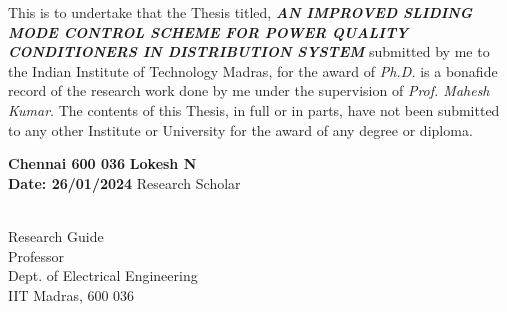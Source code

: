 \noindent This is to undertake that the Thesis titled, \textit{\textbf{AN IMPROVED SLIDING MODE CONTROL SCHEME FOR POWER QUALITY CONDITIONERS IN DISTRIBUTION SYSTEM}} submitted by me to the Indian Institute of Technology Madras, for the  award  of \textit{Ph.D.} is  a  bonafide  record  of  the  research  work  done  by  me  under  the supervision of \textit{Prof. Mahesh Kumar}. The contents of this Thesis, in full or in parts, have not been submitted to any other Institute or University for the award of any degree or diploma.
%

\vspace*{0.75in}
\textbf{Chennai 600 036} \hspace{7.5cm} \textbf{Lokesh N}\\
\vspace{-1.5cm}
\textbf{Date: 26/01/2024} \hspace{7.45cm} Research Scholar\\
%
\vspace*{1.2in}
%
\begin{singlespacing}
\vspace*{0.5in}
%
\hspace*{3.5in} 
\parbox{2.5in}{
 \\
\noindent Research Guide \\ 
\noindent Professor \\
\noindent Dept. of Electrical Engineering\\
\noindent IIT Madras, 600 036 \\
}  
\end{singlespacing}
%
